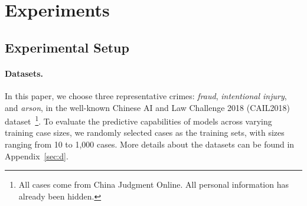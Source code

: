 \section{Experiments}




\subsection{Experimental Setup} \label{es}
\paragraph{Datasets.} In this paper, we choose three representative crimes: \textit{fraud}, \textit{intentional injury}, and \textit{arson}, in the well-known Chinese AI and Law Challenge 2018 (CAIL2018) dataset~\cite{DBLP:journals/corr/abs-1807-02478}\footnote{All cases come from China Judgment Online. All personal information has already been hidden.}. To evaluate the predictive capabilities of models across varying training case sizes, we randomly selected cases as the training sets, with sizes ranging from 10 to 1,000 cases. More details about the datasets can be found in Appendix~\ref{sec:d}.



